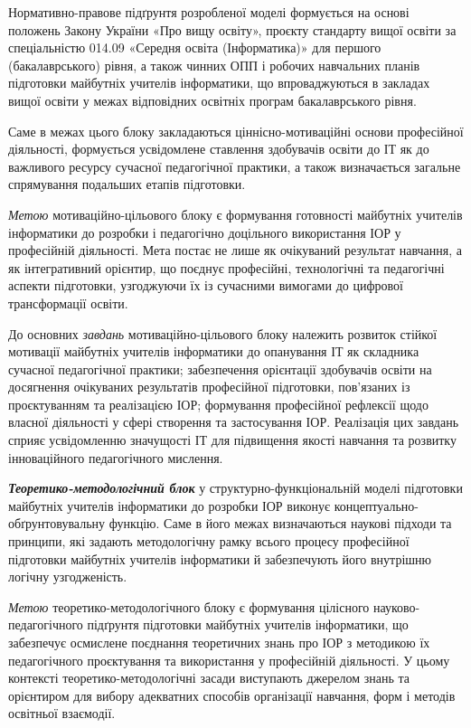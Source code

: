 Нормативно-правове підґрунтя розробленої моделі формується на основі положень Закону України «Про вищу освіту», проєкту стандарту вищої освіти за спеціальністю 014.09 «Середня освіта (Інформатика)» для першого (бакалаврського) рівня, а також чинних ОПП і робочих навчальних планів підготовки майбутніх учителів інформатики, що впроваджуються в закладах вищої освіти у межах відповідних освітніх програм бакалаврського рівня.

Саме в межах цього блоку закладаються ціннісно-мотиваційні основи професійної діяльності, формується усвідомлене ставлення здобувачів освіти до ІТ як до важливого ресурсу сучасної педагогічної практики, а також визначається загальне спрямування подальших етапів підготовки.

\emph{Метою} мотиваційно-цільового блоку є формування готовності майбутніх учителів інформатики до розробки і педагогічно доцільного використання ІОР у професійній діяльності. Мета постає не лише як очікуваний результат навчання, а як інтегративний орієнтир, що поєднує професійні, технологічні та педагогічні аспекти підготовки, узгоджуючи їх із сучасними вимогами до цифрової трансформації освіти.

До основних \emph{завдань} мотиваційно-цільового блоку належить розвиток стійкої мотивації майбутніх учителів інформатики до опанування ІТ як складника сучасної педагогічної практики; забезпечення орієнтації здобувачів освіти на досягнення очікуваних результатів професійної підготовки, пов'язаних із проєктуванням та реалізацією ІОР; формування професійної рефлексії щодо власної діяльності у сфері створення та застосування ІОР. Реалізація цих завдань сприяє усвідомленню значущості ІТ для підвищення якості навчання та розвитку інноваційного педагогічного мислення.

\emph{\textbf{Теоретико-методологічний блок}} у структурно-функціональній моделі підготовки майбутніх учителів інформатики до розробки ІОР виконує концептуально-обґрунтовувальну функцію. Саме в його межах визначаються наукові підходи та принципи, які задають методологічну рамку всього процесу професійної підготовки майбутніх учителів інформатики й забезпечують його внутрішню логічну узгодженість.

\emph{Метою} теоретико-методологічного блоку є формування цілісного науково-педагогічного підґрунтя підготовки майбутніх учителів інформатики, що забезпечує осмислене поєднання теоретичних знань про ІОР з методикою їх педагогічного проєктування та використання у професійній діяльності. У цьому контексті теоретико-методологічні засади виступають джерелом знань та орієнтиром для вибору адекватних способів організації навчання, форм і методів освітньої взаємодії.

